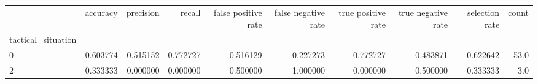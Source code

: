 \begin{tabular}{lrrrrrrrrr}
\toprule
{} &  accuracy &  precision &    recall &  false positive rate &  false negative rate &  true positive rate &  true negative rate &  selection rate &  count \\
tactical\_situation &           &            &           &                      &                      &                     &                     &                 &        \\
\midrule
0                  &  0.603774 &   0.515152 &  0.772727 &             0.516129 &             0.227273 &            0.772727 &            0.483871 &        0.622642 &   53.0 \\
2                  &  0.333333 &   0.000000 &  0.000000 &             0.500000 &             1.000000 &            0.000000 &            0.500000 &        0.333333 &    3.0 \\
\bottomrule
\end{tabular}
